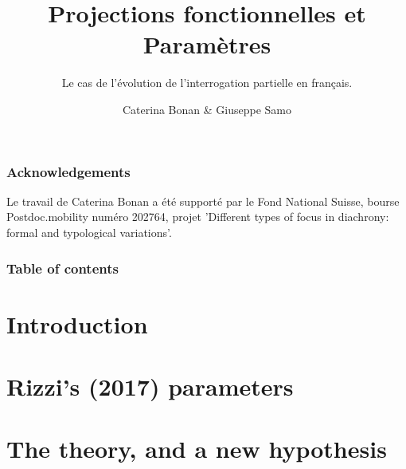 \documentclass[aspectratio=169, sectionpages, codemintedoverleaf, bibref]{beamer}
\title{Projections fonctionnelles et Paramètres}
\subtitle{Le cas de l'évolution de l'interrogation partielle en français.}
\author{Caterina Bonan \& Giuseppe Samo}
\institute{University of Cambridge; Université de Genève \& BLCU.}
\begin{document}
\titlepage

\begin{frame}
    \frametitle{Acknowledgements}
    \begin{center}
        Le travail de Caterina Bonan a été supporté par le Fond National Suisse, bourse Postdoc.mobility numéro 202764, projet 'Different types of focus in diachrony: formal and typological variations'.
    \end{center}
\end{frame}

\begin{frame}
	\frametitle{Table of contents}
	\tableofcontents
\end{frame}

\section{Introduction}



\section{Rizzi's (2017) parameters}




\section{The theory, and a new hypothesis}


\end{document}
